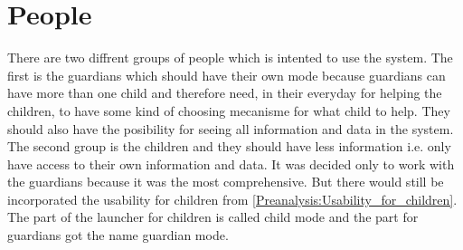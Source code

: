 \section{People}
\label{understanding:people}

There are two diffrent groups of people which is intented to use the \giraf[] system. The first is the guardians which should have their own mode because guardians can have more than one child and therefore need, in their everyday for helping the children, to have some kind of choosing mecanisme for what child to help. They should also have the posibility for seeing all information and data in the system. The second group is the children and they should have less information i.e. only have access to their own information and data.
It was decided only to work with the guardians because it was the most comprehensive. But there would still be incorporated the usability for children from \autoref{Preanalysis:Usability_for_children}.
The part of the launcher for children is called child mode and the part for guardians got the name guardian mode.